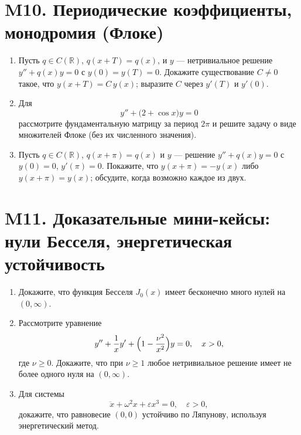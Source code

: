 \documentclass[12pt]{article}
\begin{document}
\section{M10. Периодические коэффициенты, монодромия (Флоке)}
\begin{enumerate}
\item Пусть $q\in C(\mathbb{R})$, $q(x+T)=q(x)$, и $y$ --- нетривиальное решение $y''+q(x)y=0$ с $y(0)=y(T)=0$. Докажите существование $C\ne0$ такое, что $y(x+T)=C\,y(x)$; выразите $C$ через $y'(T)$ и $y'(0)$.

\item Для
\[
y''+\bigl(2+\cos x\bigr)y=0
\]
рассмотрите фундаментальную матрицу за период $2\pi$ и решите задачу о виде множителей Флоке (без их численного значения).

\item Пусть $q\in C(\mathbb{R})$, $q(x+\pi)=q(x)$ и $y$ --- решение $y''+q(x)y=0$ с $y(0)=0$, $y'(\pi)=0$.
Покажите, что $y(x+\pi)=-y(x)$ либо $y(x+\pi)=y(x)$; обсудите, когда возможно каждое из двух.
\end{enumerate}

\section{M11. Доказательные мини-кейсы: нули Бесселя, энергетическая устойчивость}
\begin{enumerate}
\item Докажите, что функция Бесселя $J_0(x)$ имеет бесконечно много нулей на $(0,\infty)$.

\item Рассмотрите уравнение
\[
y''+\frac{1}{x}y'+\Bigl(1-\frac{\nu^2}{x^2}\Bigr)y=0,\quad x>0,
\]
где $\nu\ge0$. Докажите, что при $\nu\ge1$ любое нетривиальное решение имеет не более одного нуля на $(0,\infty)$.

\item Для системы
\[
\ddot x + \omega^2 x + \varepsilon x^3 = 0,\quad \varepsilon>0,
\]
докажите, что равновесие $(0,0)$ устойчиво по Ляпунову, используя энергетический метод.
\end{enumerate}

\end{document}
